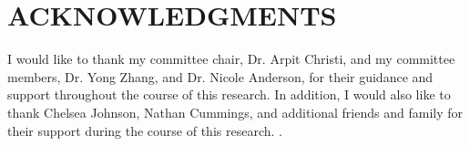 
\chapter*{ACKNOWLEDGMENTS}
\vspace{7mm}

I would like to thank my committee chair, Dr. Arpit Christi, and my committee members, Dr. Yong Zhang, and Dr. Nicole Anderson, for their guidance and support throughout the course of this research.
In addition, I would also like to thank Chelsea Johnson, Nathan Cummings, and additional friends and family for their support during the course of this research.
. 
